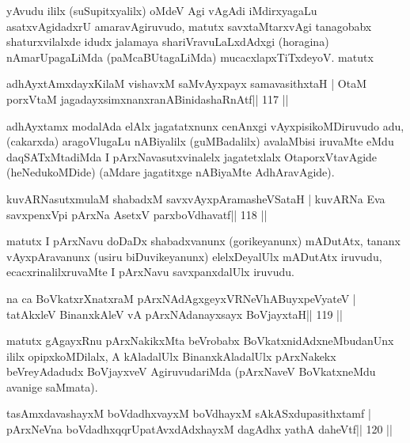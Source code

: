 \begin{artha}
yAvudu ililx (suSupitxyalilx) oMdeV Agi vAgAdi iMdirxyagaLu asatxvAgidadxrU amaravAgiruvudo, matutx savxtaMtarxvAgi tanagobabx shaturxvilalxde idudx jalamaya shariVravuLaLxdAdxgi (horagina) nAmarUpagaLiMda (paMcaBUtagaLiMda) mucacxlapxTiTxdeyoV. matutx
\end{artha}

\begin{shl}
adhAyxtAmxdayxKilaM vishavxM saMvAyxpayx samavasithxtaH |
OtaM porxVtaM jagadayxsimxnanxranABinidashaRnAtf\hfill || 117 ||
\end{shl}

\begin{artha}
adhAyxtamx modalAda elAlx jagatatxnunx cenAnxgi vAyxpisikoMDiruvudo  adu, (cakarxda) aragoVlugaLu nABiyalilx (guMBadalilx) avalaMbisi  iruvaMte eMdu daqSATxMtadiMda I pArxNavasutxvinalelx jagatetxlalx OtaporxVtavAgide (heNedukoMDide) (aMdare jagatitxge nABiyaMte AdhAravAgide).  
\end{artha}

\begin{shl}
kuvARNasutxmulaM shabadxM savxvAyxpAramasheVSataH |
kuvARNa Eva savxpenxV\s pi pArxNa AsetxV parxboVdhavatf\hfill || 118 ||
\end{shl}

\begin{artha}
matutx I pArxNavu doDaDx shabadxvanunx (gorikeyanunx) mADutAtx, tananx vAyxpAravanunx (usiru biDuvikeyanunx) elelxDeyalUlx mADutAtx iruvudu, ecacxrinalilxruvaMte I pArxNavu savxpanxdalUlx iruvudu.
\end{artha}

\begin{shl}
na ca BoVkatxrXnatxraM pArxNAdAgxgeyxVRNeVhABuyxpeVyateV |
tatAkxleV BinanxkAleV vA pArxNAdanayxsayx BoVjayxtaH\hfill || 119 ||
\end{shl}

\begin{artha}
matutx gAgayxRnu pArxNakikxMta beVrobabx BoVkatxnidAdxneMbudanUnx ililx  opipxkoMDilalx, A kAladalUlx BinanxkAladalUlx pArxNakekx beVreyAdadudx BoVjayxveV AgiruvudariMda (pArxNaveV BoVkatxneMdu avanige saMmata).
\end{artha}

\begin{shl}
tasAmxdavashayxM boVdadhxvayxM boVdhayxM sAkASxdupasithxtamf |
pArxNeVna boVdadhxqqrUpatAvxdAdxhayxM dagAdhx yathA daheVtf\hfill || 120 ||
\end{shl}

